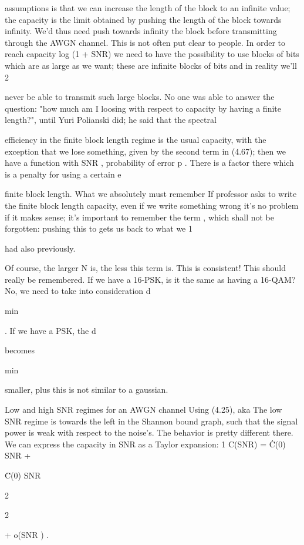 {{{{{assumptions is that we can increase the length of the block to an infinite value; the capacity is the limit obtained by pushing the length of the block towards infinity. We'd thus need push towards infinity the block before transmitting through the AWGN channel.
This is not often put clear to people.
In order to reach capacity log (1 + SNR) we need to have the possibility to use blocks of bits which are as large as we want; these are infinite blocks of bits and in reality we'll 2

never be able to transmit such large blocks.
No one was able to answer the question: "how much am I loosing with respect to capacity by having a finite length?", until Yuri Polianski did; he said that the spectral

efficiency in the finite block length regime is the usual capacity, with the exception that we lose something, given by the second term in (4.67); then we have a function with SNR
, probability of error p . There is a factor there which is a penalty for using a certain e

finite block length.
What we absolutely must remember If professor asks to write the finite block length capacity, even if we write something wrong it's no problem if it makes sense; it's important to remember the term
, which shall not be forgotten: pushing this to \infty gets us back to what we 1

\sqrtN

had also previously.

Of course, the larger N is, the less this term is. This is consistent!
This should really be remembered.
If we have a 16-PSK, is it the same as having a 16-QAM?
No, we need to take into consideration d

min

. If we have a PSK, the d

becomes

min

smaller, plus this is not similar to a gaussian.

Low and high SNR regimes for an AWGN channel Using (4.25), aka The low SNR regime is towards the left in the Shannon bound graph, such that the signal power is weak with respect to the noise's. The behavior is pretty different there. We can express the capacity in SNR as a Taylor expansion:
1 C(SNR) = Ċ(0) SNR +

C̈(0) SNR

2

2

+ o(SNR ) .

}}}}}
